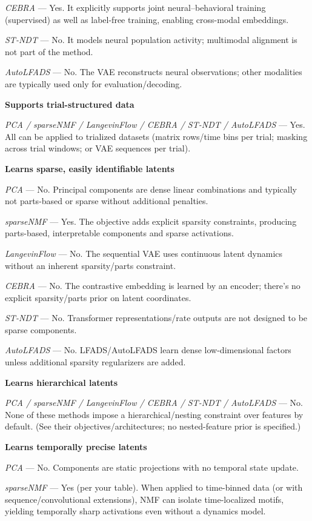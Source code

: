 \textit{CEBRA} — Yes. It explicitly supports joint neural–behavioral training (supervised) as well as label-free training, enabling cross-modal embeddings.

\textit{ST-NDT} — No. It models neural population activity; multimodal alignment is not part of the method.

\textit{AutoLFADS} — No. The VAE reconstructs neural observations; other modalities are typically used only for evaluation/decoding.

\textbf{Supports trial-structured data}

\textit{PCA / sparseNMF / LangevinFlow / CEBRA / ST-NDT / AutoLFADS} — Yes. All can be applied to trialized datasets (matrix rows/time bins per trial; masking across trial windows; or VAE sequences per trial).

\textbf{Learns sparse, easily identifiable latents}

\textit{PCA} — No. Principal components are dense linear combinations and typically not parts-based or sparse without additional penalties.

\textit{sparseNMF} — Yes. The objective adds explicit sparsity constraints, producing parts-based, interpretable components and sparse activations.

\textit{LangevinFlow} — No. The sequential VAE uses continuous latent dynamics without an inherent sparsity/parts constraint.

\textit{CEBRA} — No. The contrastive embedding is learned by an encoder; there's no explicit sparsity/parts prior on latent coordinates.

\textit{ST-NDT} — No. Transformer representations/rate outputs are not designed to be sparse components.

\textit{AutoLFADS} — No. LFADS/AutoLFADS learn dense low-dimensional factors unless additional sparsity regularizers are added.

\textbf{Learns hierarchical latents}

\textit{PCA / sparseNMF / LangevinFlow / CEBRA / ST-NDT / AutoLFADS} — No. None of these methods impose a hierarchical/nesting constraint over features by default. (See their objectives/architectures; no nested-feature prior is specified.)

\textbf{Learns temporally precise latents}

\textit{PCA} — No. Components are static projections with no temporal state update.

\textit{sparseNMF} — Yes (per your table). When applied to time-binned data (or with sequence/convolutional extensions), NMF can isolate time-localized motifs, yielding temporally sharp activations even without a dynamics model.

